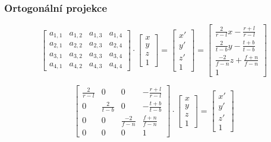 \begin{frame}
\frametitle{Ortogonální projekce}
$$
\left[
\begin{array}{cccc} 
a_{1,1} & a_{1,2} & a_{1,3} & a_{1,4} \\
a_{2,1} & a_{2,2} & a_{2,3} & a_{2,4} \\
a_{3,1} & a_{3,2} & a_{3,3} & a_{3,4} \\
a_{4,1} & a_{4,2} & a_{4,3} & a_{4,4}
\end{array}
\right]
\cdot
\left[
\begin{array}{c}
x \\
y \\
z \\
1
\end{array}
\right]
=
\left[
\begin{array}{c} 
x' \\
y' \\
z' \\
1
\end{array}
\right]
=
\left[
\begin{array}{c} 
\frac{2}{r-l}x - \frac{r+l}{r-l}\\
\frac{2}{t-b}y - \frac{t+b}{t-b}\\
\frac{-2}{f-n}z + \frac{f+n}{f-n}\\
1
\end{array}
\right]
$$

$$
\left[
\begin{array}{cccc} 
\frac{2}{r-l} & 0             & 0              & -\frac{r+l}{r-l} \\
0             & \frac{2}{t-b} & 0              & -\frac{t+b}{t-b} \\
0             & 0             & \frac{-2}{f-n} & \frac{f+n}{f-n} \\
0             & 0             & 0              & 1
\end{array}
\right]
\cdot
\left[
\begin{array}{c}
x \\
y \\
z \\
1
\end{array}
\right]
=
\left[
\begin{array}{c} 
x' \\
y' \\
z' \\
1
\end{array}
\right]
$$
\end{frame}

